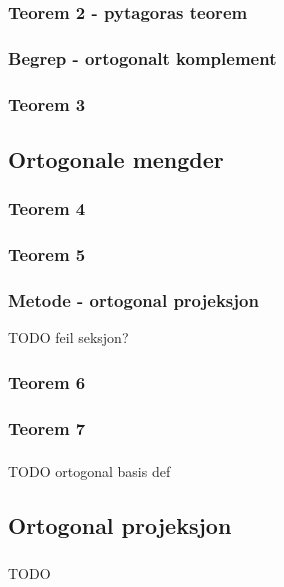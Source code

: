 \documentclass{article}
\begin{document}
      \subsubsection{Teorem 2 - pytagoras teorem}
        
      \subsubsection{Begrep - ortogonalt komplement}
        
      \subsubsection{Teorem 3}
        
    \subsection{Ortogonale mengder}
      \subsubsection{Teorem 4}
        
      \subsubsection{Teorem 5}
        
      \subsubsection{Metode - ortogonal projeksjon}
        
        TODO feil seksjon?
      \subsubsection{Teorem 6}
        
      \subsubsection{Teorem 7}
        
      \subsubsection{}
        TODO ortogonal basis def
    \subsection{Ortogonal projeksjon}
      \subsubsection{}
        TODO
\end{document}
